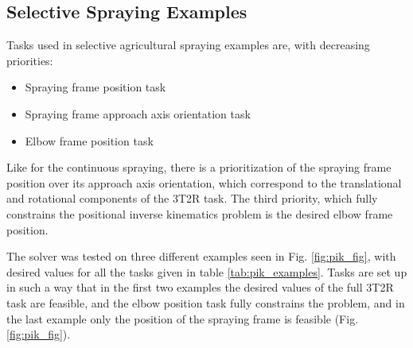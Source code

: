 \begin{comment}
 The framework allows for user defined parameters used by solver, which are:
\begin{itemize}
    \item Change in joint angle constraint
    \item Positional clamp magnitude
    \item Orientational clamp magnitude
    \item Use constrained optimization
    \item Error norm threshold
    \item Maximum execution time
    \item Maximum number of iterations
\end{itemize}   
\end{comment}

\subsection{Selective Spraying Examples}
Tasks used in selective agricultural spraying examples are, with decreasing priorities:
\begin{itemize}
    \item Spraying frame position task
    \item Spraying frame approach axis orientation task
    \item Elbow frame position task
\end{itemize}

Like for the continuous spraying, there is a prioritization of the spraying frame position over its approach axis orientation, which correspond to the translational and rotational components of the 3T2R task. The third priority, which fully constrains the positional inverse kinematics problem is the desired elbow frame position.

The solver was tested on three different examples seen in Fig. \ref{fig:pik_fig}, with desired values for all the tasks given in table \ref{tab:pik_examples}. Tasks are set up in such a way that in the first two examples the desired values of the full 3T2R task are feasible, and the elbow position task fully constrains the problem, and in the last example only the position of the spraying frame is feasible (Fig. \ref{fig:pik_fig}). 

